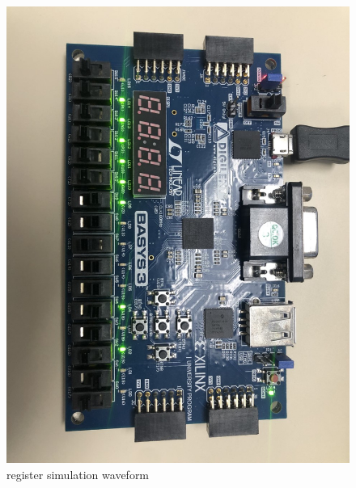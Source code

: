 \documentclass[11pt]{article}
\begin{document}
\begin{figure}[ht]\centering
	\includegraphics[width= \textwidth ]{bb6.png}
	\caption{register simulation waveform}
	\label{fig: bb6}
\end{figure}
\end{document}
